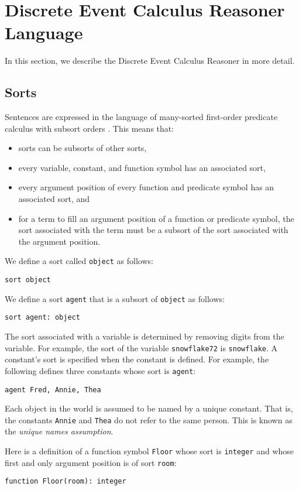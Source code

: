 \documentclass{article}
\begin{document}
\section{Discrete Event Calculus Reasoner Language}
In this section, we describe the Discrete Event Calculus Reasoner
in more detail.

\subsection{Sorts}
Sentences are expressed in the language of many-sorted first-order predicate
calculus with subsort orders \cite{Walther:1987}. This means that:
\begin{itemize}
\item
sorts can be subsorts of other sorts,
\item
every variable, constant, and function symbol has an associated sort,
\item
every argument position of every function and predicate symbol has an
associated sort, and
\item
for a term to fill an argument position of a function or predicate
symbol, the sort associated with the term must be a subsort of the
sort associated with the argument position.
\end{itemize}

We define a sort called {\tt object} as follows:
\begin{verbatim}
sort object
\end{verbatim}
We define a sort {\tt agent} that is a subsort of {\tt object} as follows:
\begin{verbatim}
sort agent: object
\end{verbatim}

The sort associated with a variable is determined by removing digits
from the variable. For example, the sort of the variable
{\tt snowflake72} is {\tt snowflake}. A constant's sort is specified
when the constant is defined. For example, the following defines
three constants whose sort is {\tt agent}:
\begin{verbatim}
agent Fred, Annie, Thea
\end{verbatim}
Each object in the world is assumed to be named by a unique constant.
That is, the constants {\tt Annie} and {\tt Thea} do not refer to the
same person. This is known as the {\em unique names assumption}.

Here is a definition of a function symbol {\tt Floor} whose sort is
{\tt integer} and whose first and only argument position is of sort
{\tt room}:
\begin{verbatim}
function Floor(room): integer
\end{verbatim}
\end{document}
